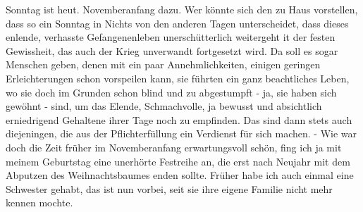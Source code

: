 \def\day{1. November 1942}
\mktitle

Sonntag ist heut.
Novemberanfang dazu.
Wer k\"{o}nnte sich den zu Haus vorstellen, dass so ein Sonntag in Nichts von den anderen Tagen unterscheidet, dass dieses enlende, verhasste Gefangenenleben unersch\"{u}tterlich weitergeht  it der festen Gewissheit, das auch der Krieg unverwandt fortgesetzt wird.
Da soll es sogar Menschen geben, denen mit ein paar Annehmlichkeiten, einigen geringen Erleichterungen schon vorspeilen kann, sie f\"{u}hrten ein ganz beachtliches Leben, wo sie doch im Grunden schon blind  und zu abgestumpft - ja, sie haben sich gew\"{o}hnt - sind, um das Elende, Schmachvolle, ja bewusst und absichtlich erniedrigend Gehaltene ihrer Tage noch zu empfinden.
Das sind dann stets auch diejeningen, die aus der Pflichterf\"{u}llung ein Verdienst f\"{u}r sich machen.
- Wie war doch die Zeit fr\"{u}her im Novemberanfang erwartungsvoll sch\"{o}n, fing ich ja mit meinem Geburtstag eine unerh\"{o}rte Festreihe an, die erst nach Neujahr mit dem Abputzen des Weihnachtsbaumes enden sollte.
Fr\"{u}her habe ich auch einmal eine Schwester gehabt, das ist nun vorbei, seit sie ihre eigene Familie nicht mehr kennen mochte.


\clearpage
